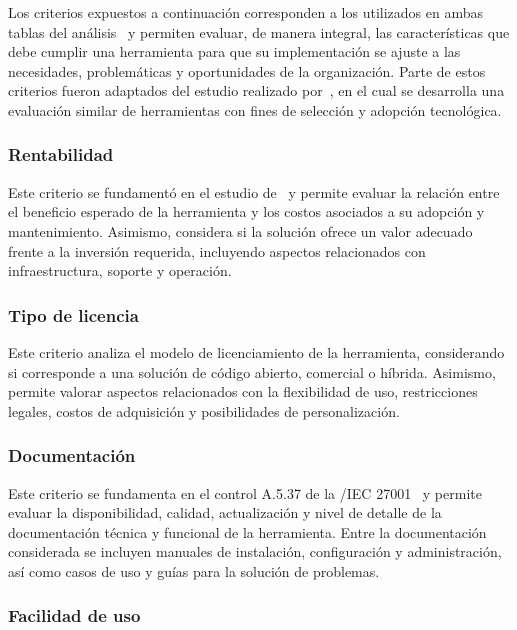 Los criterios expuestos a continuación corresponden a los utilizados en ambas tablas del análisis \DAR\ y permiten evaluar, de manera 
integral, las características que debe cumplir una herramienta para que su implementación se ajuste a las necesidades, problemáticas y 
oportunidades de la organización. Parte de estos criterios fueron adaptados del estudio realizado por~\cite{hadi2024opensource}, en el 
cual se desarrolla una evaluación similar de herramientas con fines de selección y adopción tecnológica.

\subsubsection{Rentabilidad}

Este criterio se fundamentó en el estudio de~\cite{hadi2024opensource} y permite evaluar la relación entre el beneficio esperado de la 
herramienta y los costos asociados a su adopción y mantenimiento. Asimismo, considera si la solución ofrece un valor adecuado frente a la 
inversión requerida, incluyendo aspectos relacionados con infraestructura, soporte y operación.

\subsubsection{Tipo de licencia}

Este criterio analiza el modelo de licenciamiento de la herramienta, considerando si corresponde a una solución de código abierto, 
comercial o híbrida. Asimismo, permite valorar aspectos relacionados con la flexibilidad de uso, restricciones legales, costos de 
adquisición y posibilidades de personalización.

\subsubsection{Documentación}

Este criterio se fundamenta en el control A.5.37 de la \ISO/IEC 27001~\cite{iso27001} y permite evaluar la disponibilidad, calidad, 
actualización y nivel de detalle de la documentación técnica y funcional de la herramienta. Entre la documentación considerada se incluyen 
manuales de instalación, configuración y administración, así como casos de uso y guías para la solución de problemas.

\subsubsection{Facilidad de uso}

